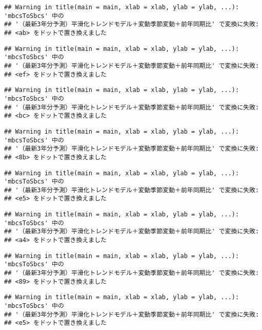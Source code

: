 \documentclass[]{article}
\begin{document}
\begin{verbatim}
## Warning in title(main = main, xlab = xlab, ylab = ylab, ...): 'mbcsToSbcs' 中の
## '（最新3年分予測）平滑化トレンドモデル＋変動季節変動＋前年同期比' で変換に失敗:
## <ab> をドットで置き換えました
\end{verbatim}

\begin{verbatim}
## Warning in title(main = main, xlab = xlab, ylab = ylab, ...): 'mbcsToSbcs' 中の
## '（最新3年分予測）平滑化トレンドモデル＋変動季節変動＋前年同期比' で変換に失敗:
## <ef> をドットで置き換えました
\end{verbatim}

\begin{verbatim}
## Warning in title(main = main, xlab = xlab, ylab = ylab, ...): 'mbcsToSbcs' 中の
## '（最新3年分予測）平滑化トレンドモデル＋変動季節変動＋前年同期比' で変換に失敗:
## <bc> をドットで置き換えました
\end{verbatim}

\begin{verbatim}
## Warning in title(main = main, xlab = xlab, ylab = ylab, ...): 'mbcsToSbcs' 中の
## '（最新3年分予測）平滑化トレンドモデル＋変動季節変動＋前年同期比' で変換に失敗:
## <8b> をドットで置き換えました
\end{verbatim}

\begin{verbatim}
## Warning in title(main = main, xlab = xlab, ylab = ylab, ...): 'mbcsToSbcs' 中の
## '（最新3年分予測）平滑化トレンドモデル＋変動季節変動＋前年同期比' で変換に失敗:
## <e5> をドットで置き換えました
\end{verbatim}

\begin{verbatim}
## Warning in title(main = main, xlab = xlab, ylab = ylab, ...): 'mbcsToSbcs' 中の
## '（最新3年分予測）平滑化トレンドモデル＋変動季節変動＋前年同期比' で変換に失敗:
## <a4> をドットで置き換えました
\end{verbatim}

\begin{verbatim}
## Warning in title(main = main, xlab = xlab, ylab = ylab, ...): 'mbcsToSbcs' 中の
## '（最新3年分予測）平滑化トレンドモデル＋変動季節変動＋前年同期比' で変換に失敗:
## <89> をドットで置き換えました
\end{verbatim}

\begin{verbatim}
## Warning in title(main = main, xlab = xlab, ylab = ylab, ...): 'mbcsToSbcs' 中の
## '（最新3年分予測）平滑化トレンドモデル＋変動季節変動＋前年同期比' で変換に失敗:
## <e5> をドットで置き換えました
\end{verbatim}
\end{document}
